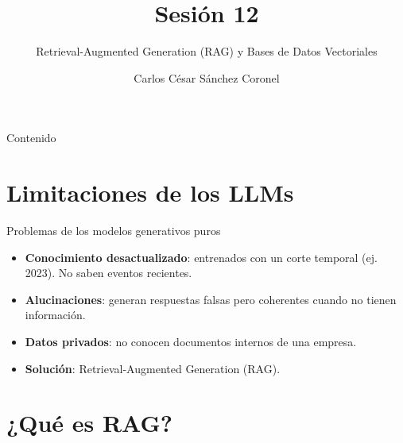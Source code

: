 \documentclass[aspectratio=169, 10pt, xcolor=table]{beamer}
\title[SESI\'ON 12 NLP]{\textbf{Sesi\'on 12}}
\subtitle{Retrieval-Augmented Generation (RAG) y Bases de Datos Vectoriales}
\author[Prof. C. S\'anchez]{Carlos C\'esar S\'anchez Coronel}
\institute{\textbf{NLP}}
\date{}
\begin{document}
\begin{frame}
    \titlepage
\end{frame}

\begin{frame}{Contenido}
    \tableofcontents
\end{frame}

\section{Limitaciones de los LLMs}

\begin{frame}{Problemas de los modelos generativos puros}
    \begin{itemize}
        \item \textbf{Conocimiento desactualizado}: entrenados con un corte temporal (ej. 2023). No saben eventos recientes.
        \item \textbf{Alucinaciones}: generan respuestas falsas pero coherentes cuando no tienen informaci\'on.
        \item \textbf{Datos privados}: no conocen documentos internos de una empresa.
        \item \textbf{Soluci\'on}: Retrieval-Augmented Generation (RAG).
    \end{itemize}
\end{frame}

\section{¿Qu\'e es RAG?}
\end{document}
